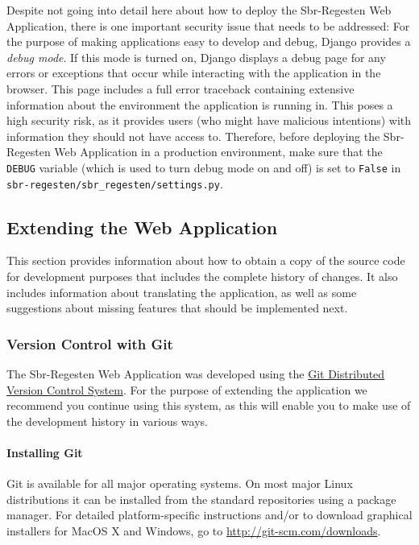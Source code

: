 Despite not going into detail here about how to deploy the
Sbr-Regesten Web Application, there is one important security issue
that needs to be addressed: For the purpose of making applications
easy to develop and debug, Django provides a \emph{debug mode}. If
this mode is turned on, Django displays a debug page for any errors or
exceptions that occur while interacting with the application in the
browser. This page includes a full error traceback containing
extensive information about the environment the application is running
in. This poses a high security risk, as it provides users (who might
have malicious intentions) with information they should not have
access to. Therefore, before deploying the Sbr-Regesten Web
Application in a production environment, make sure that the
\texttt{DEBUG} variable (which is used to turn debug mode on and off)
is set to \texttt{False} in
\texttt{sbr-regesten/sbr\_regesten/settings.py}.

\subsection{Extending the Web Application}
\label{sec:extend}

This section provides information about how to obtain a copy of the
source code for development purposes that includes the complete
history of changes. It also includes information about translating the
application, as well as some suggestions about missing features that
should be implemented next.

\subsubsection{Version Control with Git}
\label{sec:git}

The Sbr-Regesten Web Application was developed using the
\href{http://git-scm.com/}{Git Distributed Version Control System}.
For the purpose of extending the application we recommend you continue
using this system, as this will enable you to make use of the
development history in various ways.

\paragraph{Installing Git}

Git is available for all major operating systems. On most major Linux
distributions it can be installed from the standard repositories using
a package manager. For detailed platform-specific instructions and/or
to download graphical installers for MacOS X and Windows, go to
\url{http://git-scm.com/downloads}.

